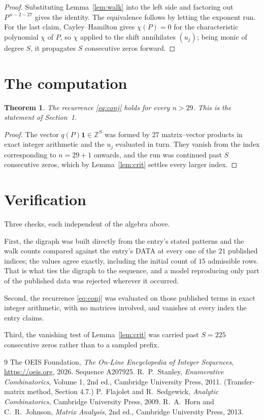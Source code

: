 \documentclass[11pt,a4paper]{article}
\theoremstyle{plain}
\newtheorem{theorem}{Theorem}
\theoremstyle{definition}
\begin{document}
\begin{proof}
Substituting Lemma~\ref{lem:walk} into the left side and factoring out
$P^{\,n-2-27}$ gives the identity. The equivalence follows by letting the exponent
run. For the last claim, Cayley--Hamilton gives $\chi(P)=0$ for the characteristic
polynomial $\chi$ of $P$, so $\chi$ applied to the shift annihilates $(u_j)$; being monic of
degree $S$, it propagates $S$ consecutive zeros forward.
\end{proof}

\section{The computation}

\begin{theorem}
The recurrence \eqref{eq:conj} holds for every $n>29$. This is the statement of
Section~1.
\end{theorem}

\begin{proof}
The vector $q(P)\mathbf{1}\in\mathbb{Z}^{S}$ was formed by $27$ matrix--vector
products in exact integer arithmetic and the $u_j$ evaluated in turn. They vanish from the
index corresponding to $n=29+1$ onwards, and the run was continued past $S$ consecutive
zeros, which by Lemma~\ref{lem:crit} settles every larger index.
\end{proof}

\section{Verification}

Three checks, each independent of the algebra above.

First, the digraph was built directly from the entry's stated patterns and the walk counts
compared against the entry's DATA at every one of the $21$ published indices; the
values agree exactly, including the initial count of $15$ admissible rows. That is
what ties the digraph to the sequence, and a model reproducing only part of the published
data was rejected wherever it occurred.

Second, the recurrence \eqref{eq:conj} was evaluated on those published terms in exact
integer arithmetic, with no matrices involved, and vanishes at every index the entry claims.

Third, the vanishing test of Lemma~\ref{lem:crit} was carried past $S=225$ consecutive
zeros rather than to a sampled prefix.

\begin{thebibliography}{9}
 The OEIS Foundation, \emph{The On-Line Encyclopedia of Integer
Sequences}, \url{https://oeis.org}, 2026. Sequence A207925.
 R.~P.~Stanley, \emph{Enumerative Combinatorics}, Volume 1, 2nd ed.,
Cambridge University Press, 2011. (Transfer-matrix method, Section 4.7.)
 P.~Flajolet and R.~Sedgewick, \emph{Analytic Combinatorics}, Cambridge
University Press, 2009.
 R.~A.~Horn and C.~R.~Johnson, \emph{Matrix Analysis}, 2nd ed., Cambridge
University Press, 2013.
\end{thebibliography}
\end{document}
